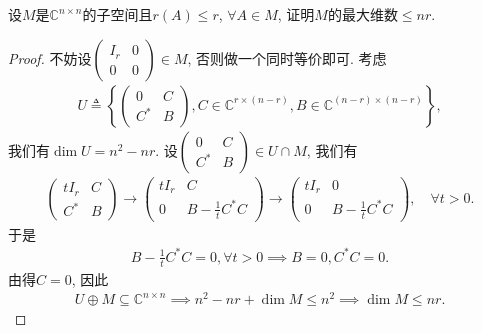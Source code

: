 \documentclass[../../main.tex]{subfiles}%
\begin{document}
\begin{example}
设$M$是$\mathbb{C}^{n\times n}$的子空间且$r(A)\leqslant r$, $\forall A\in M$, 证明$M$的最大维数$\leqslant nr$.
\end{example}

\begin{proof}
不妨设$\begin{pmatrix} I_r & 0 \\ 0 & 0 \end{pmatrix} \in M$, 否则做一个同时等价即可. 考虑
\begin{align*}
U \triangleq \left\{ \begin{pmatrix} 0 & C \\ C^* & B \end{pmatrix}, C\in \mathbb{C}^{r\times (n-r)}, B\in \mathbb{C}^{(n-r)\times (n-r)} \right\},
\end{align*}
我们有$\dim U = n^2 - nr$. 设$\begin{pmatrix} 0 & C \\ C^* & B \end{pmatrix} \in U\cap M$, 我们有
\begin{align*}
\begin{pmatrix} tI_r & C \\ C^* & B \end{pmatrix} \to \begin{pmatrix} tI_r & C \\ 0 & B - \frac{1}{t}C^*C \end{pmatrix} \to \begin{pmatrix} tI_r & 0 \\ 0 & B - \frac{1}{t}C^*C \end{pmatrix}, \quad \forall t>0.
\end{align*}
于是
\begin{align*}
B - \frac{1}{t}C^*C = 0, \forall t>0 \implies B=0, C^*C=0.
\end{align*}
由得$C=0$, 因此
\begin{align*}
U \oplus M \subseteq \mathbb{C}^{n\times n} \implies n^2 - nr + \dim M \leqslant n^2 \implies \dim M \leqslant nr.
\end{align*}
\end{proof}
\end{document}
